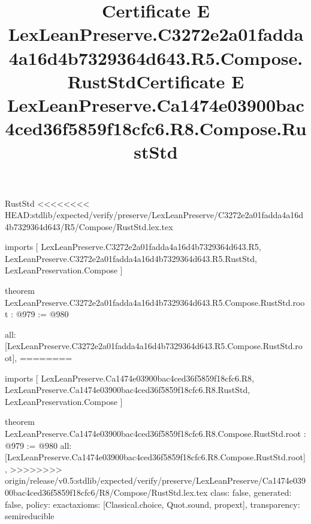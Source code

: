 \begin{lexlean}{RustStd}
<<<<<<<< HEAD:stdlib/expected/verify/preserve/LexLeanPreserve/C3272e2a01fadda4a16d4b7329364d643/R5/Compose/RustStd.lex.tex
\title{Certificate E LexLeanPreserve.C3272e2a01fadda4a16d4b7329364d643.R5.Compose.RustStd}
\begin{coremodule}
imports [
  LexLeanPreserve.C3272e2a01fadda4a16d4b7329364d643.R5,
  LexLeanPreserve.C3272e2a01fadda4a16d4b7329364d643.R5.RustStd,
  LexLeanPreservation.Compose
]

theorem LexLeanPreserve.C3272e2a01fadda4a16d4b7329364d643.R5.Compose.RustStd.root : @979 := @980 {
  all: [LexLeanPreserve.C3272e2a01fadda4a16d4b7329364d643.R5.Compose.RustStd.root],
========
\title{Certificate E LexLeanPreserve.Ca1474e03900bac4ced36f5859f18cfc6.R8.Compose.RustStd}
\begin{coremodule}
imports [
  LexLeanPreserve.Ca1474e03900bac4ced36f5859f18cfc6.R8,
  LexLeanPreserve.Ca1474e03900bac4ced36f5859f18cfc6.R8.RustStd,
  LexLeanPreservation.Compose
]

theorem LexLeanPreserve.Ca1474e03900bac4ced36f5859f18cfc6.R8.Compose.RustStd.root : @979 := @980 {
  all: [LexLeanPreserve.Ca1474e03900bac4ced36f5859f18cfc6.R8.Compose.RustStd.root],
>>>>>>>> origin/release/v0.5:stdlib/expected/verify/preserve/LexLeanPreserve/Ca1474e03900bac4ced36f5859f18cfc6/R8/Compose/RustStd.lex.tex
  class: false,
  generated: false,
  policy: exact{axioms: [Classical.choice, Quot.sound, propext]},
  transparency: semireducible
}


\end{coremodule}}
\end{coremodule}
\end{lexlean}
